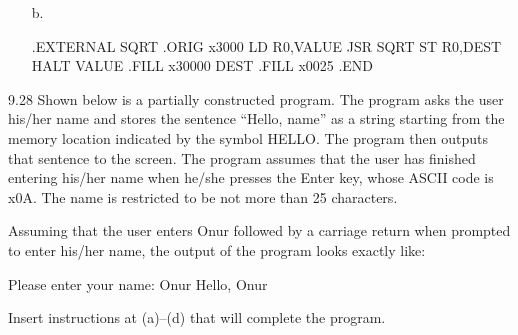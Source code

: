 \documentclass{patt}
\begin{document}
\begin{exercises}
\begin{enumerate}[a.]
\item[b.]
\begin{colorverbatim}
                .EXTERNAL SQRT
                .ORIG   x3000
                LD      R0,VALUE
                JSR     SQRT
                ST      R0,DEST
                HALT
        VALUE   .FILL   x30000
        DEST    .FILL   x0025
                .END













\end{colorverbatim}
\end{enumerate}

\item[9.28] Shown below is a partially constructed program. The
  program asks the user his/her name and stores the sentence ``Hello,
  name'' as a string starting from the memory location indicated by
  the symbol HELLO. The program then outputs that sentence to the
  screen. The program assumes that the user has finished entering
  his/her name when he/she presses the Enter key, whose ASCII code is
  x0A. The name is restricted to be not more than 25 characters.

  Assuming that the user enters Onur followed by a carriage return
  when prompted to enter his/her name, the output of the program looks
  exactly like:

\begin{colorverbatim}
Please enter your name: Onur
Hello, Onur
\end{colorverbatim}

Insert instructions at (a)--(d) that will complete the program.

\end{exercises}
\end{document}
